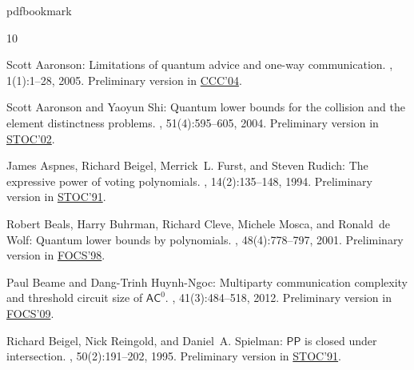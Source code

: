 %
%
%
%
%
\providecommand{\bibhead}[1]{}
%
\expandafter\ifx\csname pdfbookmark\endcsname\relax%
  \providecommand{\tocrefpdfbookmark}{}
\else\providecommand{\tocrefpdfbookmark}{%
   \hypertarget{tocreferences}{}%
   \pdfbookmark[1]{References}{tocreferences}}%
\fi

\tocrefpdfbookmark
\begin{thebibliography}{10}

\bibhead{aaronson04sdpt-for-search}
{\sc Scott Aaronson}: Limitations of quantum advice and one-way communication.
, 1(1):1--28, 2005.
\newblock Preliminary version in
  \href{http://dx.doi.org/10.1109/CCC.2004.1313854}{CCC'04}.

\bibhead{aaronson-shi04distinctness}
{\sc Scott Aaronson and Yaoyun Shi}: Quantum lower bounds for the collision and
  the element distinctness problems.
, 51(4):595--605, 2004.
\newblock Preliminary version in
  \href{http://dx.doi.org/10.1145/509907.509999}{STOC'02}.
\newblock [\epfmtdoi{10.1145/1008731.1008735}]

\bibhead{aspnes91voting}
{\sc James Aspnes, Richard Beigel, Merrick~L. Furst, and Steven Rudich}: The
  expressive power of voting polynomials.
, 14(2):135--148, 1994.
\newblock Preliminary version in
  \href{http://dx.doi.org/10.1145/103418.103461}{STOC'91}.
\newblock [\epfmtdoi{10.1007/BF01215346}]

\bibhead{beals-et-al01quantum-by-polynomials}
{\sc Robert Beals, Harry Buhrman, Richard Cleve, Michele Mosca, and Ronald~de
  Wolf}: Quantum lower bounds by polynomials.
, 48(4):778--797, 2001.
\newblock Preliminary version in
  \href{http://dx.doi.org/10.1109/SFCS.1998.743485}{FOCS'98}.
\newblock [\epfmtdoi{10.1145/502090.502097}]

\bibhead{beame-huyn-ngoc09multiparty-focs}
{\sc Paul Beame and Dang-Trinh {Huynh-Ngoc}}: Multiparty communication
  complexity and threshold circuit size of {$\mathsf{AC}^0$}.
, 41(3):484--518, 2012.
\newblock Preliminary version in
  \href{http://dx.doi.org/10.1109/FOCS.2009.12}{FOCS'09}.
\newblock [\epfmtdoi{10.1137/100792779}]

\bibhead{beigel91rational}
{\sc Richard Beigel, Nick Reingold, and Daniel~A. Spielman}: {$\mathsf{PP}$} is
  closed under intersection.
, 50(2):191--202, 1995.
\newblock Preliminary version in
  \href{http://dx.doi.org/10.1145/103418.103426}{STOC'91}.


\end{thebibliography}

